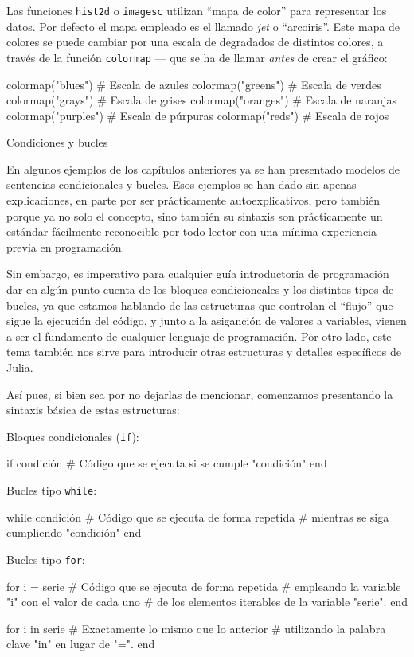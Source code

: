 ﻿\documentclass{article}
\newcommand{\jl}{\texttt}
\begin{document}
Las funciones \jl{hist2d} o \jl{imagesc} utilizan ``mapa de color'' para representar los datos. Por defecto el mapa empleado es el llamado \emph{jet} o ``arcoiris''. Este mapa de colores se puede cambiar por una escala de degradados de distintos colores, a través de la función \jl{colormap} --- que se ha de llamar \emph{antes} de crear el gráfico:

colormap("blues")   # Escala de azules
colormap("greens")  # Escala de verdes
colormap("grays")   # Escala de grises
colormap("oranges") # Escala de naranjas
colormap("purples") # Escala de púrpuras
colormap("reds")    # Escala de rojos


Condiciones y bucles

En algunos ejemplos de los capítulos anteriores ya se han presentado modelos de sentencias condicionales y bucles. Esos ejemplos se han dado sin apenas explicaciones, en parte por ser prácticamente autoexplicativos, pero también porque ya no solo el concepto, sino también su sintaxis son prácticamente un estándar fácilmente reconocible por todo lector con una mínima experiencia previa en programación.

Sin embargo, es imperativo para cualquier guía introductoria de programación dar en algún punto cuenta de los bloques condicioneales y los distintos tipos de bucles, ya que estamos hablando de las estructuras que controlan el ``flujo'' que sigue la ejecución del código, y junto a la asiganción de valores a variables, vienen a ser el fundamento de cualquier lenguaje de programación. Por otro lado, este tema también nos sirve para introducir otras estructuras y detalles específicos de Julia.

Así pues, si bien sea por no dejarlas de mencionar, comenzamos presentando la sintaxis básica de estas estructuras:

Bloques condicionales (\jl{if}):

if condición
  # Código que se ejecuta si se cumple "condición"
end

Bucles tipo \jl{while}:

while condición
  # Código que se ejecuta de forma repetida
  # mientras se siga cumpliendo "condición"
end

Bucles tipo \jl{for}:

for i = serie
  # Código que se ejecuta de forma repetida
  # empleando la variable "i" con el valor de cada uno
  # de los elementos iterables de la variable "serie".
end

for i in serie
  # Exactamente lo mismo que lo anterior
  # utilizando la palabra clave "in" en lugar de "=".
end
\end{document}
